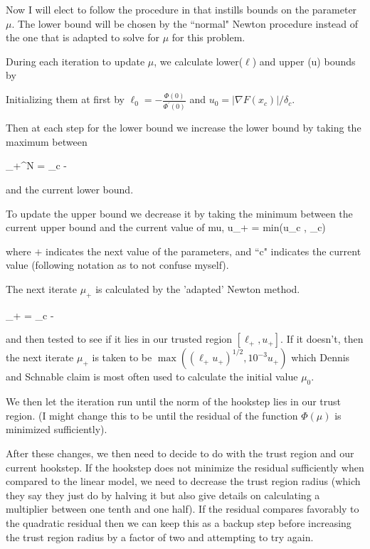 Now I will elect to follow the procedure in  that instills bounds on the parameter $\mu$.
The lower bound will be chosen by the ``normal"
Newton procedure instead of the one that is adapted to solve for $\mu$ for this problem.

During each iteration to update $\mu$, we calculate lower($\ell$) and upper (u) bounds by

Initializing them at first by $\ell_0 =- \frac{\Phi(0)}{\Phi^{\prime}(0)}$ and $u_0= |\nabla F(x_c)|/\delta_c$.

Then at each step for the lower bound we increase the lower bound by taking the maximum between

\beq
\ell_{+}^N = \mu_c - 
\eeq

and the current lower bound.

To update the upper bound we decrease it by taking the minimum between the current upper bound and the
current value of mu,
\beq
u_{+} = min(u_c , \mu_c)
\eeq

where $+$ indicates the next value of the parameters, and ``c" indicates the current value (following
 notation as to not confuse myself).

The next iterate $\mu_{+}$ is calculated by the 'adapted' Newton method.

\beq
\mu_{+} = \mu_c -  
\eeq

and then tested to see if it lies in our trusted region $[\ell_{+}, u_{+}]$. If it doesn't,
then the next iterate $\mu_{+}$ is taken to be $\max ((\ell_{+} u_{+})^{1/2}, 10^{-3} u_{+})$
which Dennis and Schnable claim is most often used to calculate the initial value $\mu_0$.

We then let the iteration run until the norm of the hookstep lies in our trust region. (I might change
this to be until the residual of the function $\Phi (\mu)$ is minimized sufficiently).

After these changes, we then need to decide to do with the trust region and our current hookstep.
If the hookstep does not minimize the residual sufficiently when compared to the linear model,
we need to decrease the trust region radius (which they say they just do by halving it but also give
details on calculating a multiplier between one tenth and one half). If the residual compares
favorably to the quadratic residual then we can keep this as a backup step before increasing the
trust region radius by a factor of two and attempting to try again.

